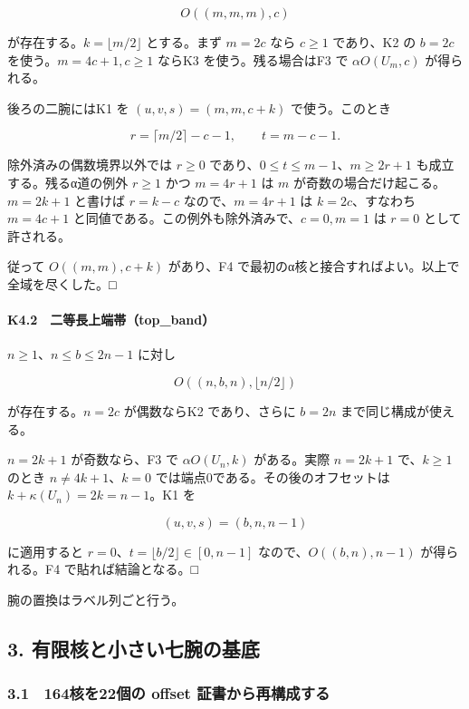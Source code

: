 \documentclass[
  10pt,
  a4paper,
]{article}
\begin{document}
\[
O((m,m,m),c)
\]

が存在する。\(k=\lfloor m/2\rfloor\) とする。まず \(m=2c\) なら
\(c\ge1\) であり、K2 の \(b=2c\) を使う。\(m=4c+1,c\ge1\) ならK3
を使う。残る場合はF3 で \(\alpha O(U_m,c)\) が得られる。

後ろの二腕にはK1 を \((u,v,s)=(m,m,c+k)\) で使う。このとき

\[
r=\lceil m/2\rceil-c-1,\qquad t=m-c-1.
\]

除外済みの偶数境界以外では \(r\ge0\)
であり、\(0\le t\le m-1\)、\(m\ge2r+1\) も成立する。残るα道の例外
\(r\ge1\) かつ \(m=4r+1\) は \(m\) が奇数の場合だけ起こる。\(m=2k+1\)
と書けば \(r=k-c\) なので、\(m=4r+1\) は \(k=2c\)、すなわち \(m=4c+1\)
と同値である。この例外も除外済みで、\(c=0,m=1\) は \(r=0\)
として許される。

従って \(O((m,m),c+k)\) があり、F4
で最初のα核と接合すればよい。以上で全域を尽くした。□

\paragraph{K4.2　二等長上端帯（top\_band）}\label{k4.2-ux4e8cux7b49ux9577ux4e0aux7aefux5e2ftop_band}

\(n\ge1\)、\(n\le b\le2n-1\) に対し

\[
O((n,b,n),\lfloor n/2\rfloor)
\]

が存在する。\(n=2c\) が偶数ならK2 であり、さらに \(b=2n\)
まで同じ構成が使える。

\(n=2k+1\) が奇数なら、F3 で \(\alpha O(U_n,k)\) がある。実際 \(n=2k+1\)
で、\(k\ge1\) のとき \(n\ne4k+1\)、\(k=0\)
では端点0である。その後のオフセットは \(k+\kappa(U_n)=2k=n-1\)。K1 を

\[
(u,v,s)=(b,n,n-1)
\]

に適用すると \(r=0\)、\(t=\lfloor b/2\rfloor\in[0,n-1]\)
なので、\(O((b,n),n-1)\) が得られる。F4 で貼れば結論となる。□

腕の置換はラベル列ごと行う。

\subsection{3.
有限核と小さい七腕の基底}\label{ux6709ux9650ux6838ux3068ux5c0fux3055ux3044ux4e03ux8155ux306eux57faux5e95}

\subsubsection{3.1　164核を22個の offset
証書から再構成する}\label{ux6838ux309222ux500bux306e-offset-ux8a3cux66f8ux304bux3089ux518dux69cbux6210ux3059ux308b}
\end{document}
